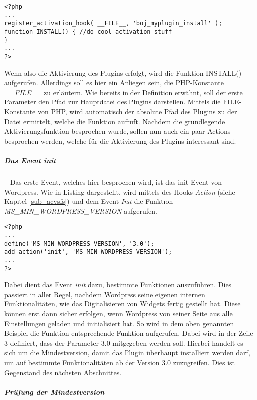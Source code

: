\begin{lstlisting}
<?php 
...
register_activation_hook( __FILE__, 'boj_myplugin_install' );
function INSTALL() { //do cool activation stuff
}
...
?> 
\end{lstlisting}
Wenn also die Aktivierung des Plugins erfolgt, wird die Funktion INSTALL() aufgerufen. Allerdings soll es hier ein Anliegen sein, die PHP-Konstante \emph{\_\_FILE\_\_} zu erläutern.\newline
Wie bereits in der Definition erwähnt, soll der erste Parameter den Pfad zur Hauptdatei des Plugins darstellen. Mittels die FILE-Konstante von PHP, wird automatisch der absolute Pfad des Plugins zu der Datei ermittelt, welche die Funktion aufruft.\newline
Nachdem die grundlegende Aktivierungsfunktion besprochen wurde, sollen nun auch ein paar Actions besprochen werden, welche für die Aktivierung des Plugins interessant sind.
\subparagraph{Das Event init}\ \newline
Das erste Event, welches hier besprochen wird, ist das init-Event von Wordpress.\newline
Wie in Listing \label{MIVERSWP} dargestellt, wird mittels des Hooks \emph{Action} (siehe Kapitel \ref{sub_acvsfs}) und dem Event \emph{Init} die Funktion \emph{MS\_MIN\_WORDPRESS\_VERSION} aufgerufen.
\begin{lstlisting}
<?php 
...
define('MS_MIN_WORDPRESS_VERSION', '3.0');
add_action('init', 'MS_MIN_WORDPRESS_VERSION');
...
?> 
\end{lstlisting}
Dabei dient das Event \emph{init} dazu, bestimmte Funktionen auszuführen. Dies passiert in aller Regel, nachdem Wordpress seine eigenen internen Funktionalitäten, wie das Digitalisieren von Widgets fertig gestellt hat. Diese können erst dann sicher erfolgen, wenn Wordpress von seiner Seite aus alle Einstellungen geladen und initialisiert hat. \newline
So wird in dem oben genannten Beispiel die Funktion entsprechende Funktion aufgerufen. Dabei wird in der Zeile 3 definiert, dass der Parameter 3.0 mitgegeben werden soll. Hierbei handelt es sich um die Mindestversion, damit das Plugin überhaupt installiert werden darf, um auf bestimmte Funktionalitäten ab der Version 3.0 zuzugreifen. Dies ist Gegenstand des nächsten Abschnittes.
\subparagraph{Prüfung der Mindestversion}\ \newline
